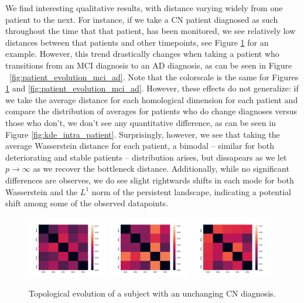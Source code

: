 \documentclass{article}
\begin{document}
We find interesting qualitative results, with distance varying widely from one patient to the next. For instance, if we take a CN patient diagnosed as such throughout the time that that patient, has been monitored, we see relatively low distances between that patients and other timepoints, see Figure \ref{fig:patient_evolution_stable} for an example. However, this trend drastically changes when taking a patient who transitions from an MCI diagnosis to an AD diagnosis, as can be seen in Figure ~\ref{fig:patient_evolution_mci_ad}. Note that the colorscale is the same for Figures \ref{fig:patient_evolution_stable} and \ref{fig:patient_evolution_mci_ad}. However, these effects do not generalize: if we take the average distance for each homological dimension for each patient and compare the distribution of averages for patients who do change diagnoses versus those who don't, we don't see any quantitative difference, as can be seen in Figure \ref{fig:kde_intra_patient}. Surprisingly, however, we see that taking the average Wasserstein distance for each patient, a bimodal -- similar for both deteriorating and stable patients -- distribution arises, but dissapears as we let $p\to\infty$ as we recover the bottleneck distance. Additionally, while no significant differences are observes, we do see slight rightwards shifts in each mode for both Wasserstein and the $L^1$ norm of the persistent landscape, indicating a potential shift among some of the observed datapoints.


\begin{figure}
  \centering
  \includegraphics[width=0.32\textwidth]{figures/temporal_evolution/ADNI011S0023_h_0.png}
  \hfill \includegraphics[width=0.32\textwidth]{figures/temporal_evolution/ADNI011S0023_h_1.png}
  \hfill \includegraphics[width=0.32\textwidth]{figures/temporal_evolution/ADNI011S0023_h_2.png}
  \caption{Topological evolution of a subject with an unchanging CN diagnosis.}
  \label{fig:patient_evolution_stable}
\end{figure}
\end{document}
